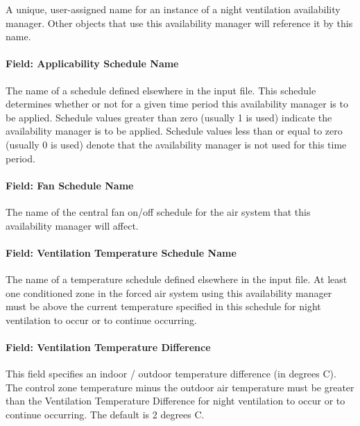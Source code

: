 A unique, user-assigned name for an instance of a night ventilation availability manager. Other objects that use this availability manager will reference it by this name.

\paragraph{Field: Applicability Schedule Name}\label{field-applicability-schedule-name-1}

The name of a schedule defined elsewhere in the input file. This schedule determines whether or not for a given time period this availability manager is to be applied. Schedule values greater than zero (usually 1 is used) indicate the availability manager is to be applied. Schedule values less than or equal to zero (usually 0 is used) denote that the availability manager is not used for this time period.

\paragraph{Field: Fan Schedule Name}\label{field-fan-schedule-name}

The name of the central fan on/off schedule for the air system that this availability manager will affect.

\paragraph{Field: Ventilation Temperature Schedule Name}\label{field-ventilation-temperature-schedule-name}

The name of a temperature schedule defined elsewhere in the input file. At least one conditioned zone in the forced air system using this availability manager must be above the current temperature specified in this schedule for night ventilation to occur or to continue occurring.

\paragraph{Field: Ventilation Temperature Difference}\label{field-ventilation-temperature-difference}

This field specifies an indoor / outdoor temperature difference (in degrees C). The control zone temperature minus the outdoor air temperature must be greater than the Ventilation Temperature Difference for night ventilation to occur or to continue occurring. The default is 2 degrees C.

